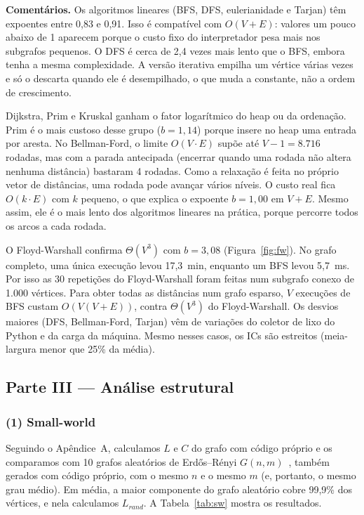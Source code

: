 \documentclass[sigconf]{webmedia}
\begin{document}
\textbf{Comentários.} Os algoritmos lineares (BFS, DFS, eulerianidade e Tarjan)
têm expoentes entre 0,83 e 0,91. Isso é compatível com $O(V+E)$: valores um pouco
abaixo de 1 aparecem porque o custo fixo do interpretador pesa mais nos subgrafos
pequenos. O DFS é cerca de 2,4 vezes mais lento que o BFS, embora tenha a mesma
complexidade. A versão iterativa empilha um vértice várias vezes e só o descarta
quando ele é desempilhado, o que muda a constante, não a ordem de crescimento.

Dijkstra, Prim e Kruskal ganham o fator logarítmico do heap ou da ordenação. Prim é
o mais custoso desse grupo ($b=1{,}14$) porque insere no heap uma entrada por
aresta. No Bellman-Ford, o limite $O(V\cdot E)$ supõe até $V-1=8.716$ rodadas, mas
com a parada antecipada (encerrar quando uma rodada não altera nenhuma distância)
bastaram 4 rodadas. Como a relaxação é feita no próprio vetor de distâncias, uma
rodada pode avançar vários níveis. O custo real fica $O(k\cdot E)$ com $k$ pequeno,
o que explica o expoente $b=1{,}00$ em $V+E$. Mesmo assim, ele é o mais lento dos
algoritmos lineares na prática, porque percorre todos os arcos a cada rodada.

O Floyd-Warshall confirma $\Theta(V^3)$ com $b=3{,}08$
(Figura~\ref{fig:fw}). No grafo completo, uma única execução levou 17,3~min,
enquanto um BFS levou 5,7~ms. Por isso as 30 repetições do Floyd-Warshall foram
feitas num subgrafo conexo de 1.000 vértices. Para obter todas as distâncias num
grafo esparso, $V$ execuções de BFS custam $O(V(V+E))$, contra $\Theta(V^3)$ do
Floyd-Warshall. Os desvios maiores (DFS, Bellman-Ford, Tarjan) vêm de variações do
coletor de lixo do Python e da carga da máquina. Mesmo nesses casos, os ICs são
estreitos (meia-largura menor que 25\% da média).

\subsection{Parte III --- Análise estrutural}

\subsubsection*{(1) Small-world}
Seguindo o Apêndice~A, calculamos $L$ e $C$ do grafo com código próprio e os
comparamos com 10 grafos aleatórios de Erdős--Rényi $G(n,m)$~\cite{erdos1959},
também gerados com código próprio, com o mesmo $n$ e o mesmo $m$ (e, portanto, o
mesmo grau médio). Em média, a maior componente do grafo aleatório cobre 99,9\% dos
vértices, e nela calculamos $L_{rand}$. A Tabela~\ref{tab:sw} mostra os resultados.
\end{document}
